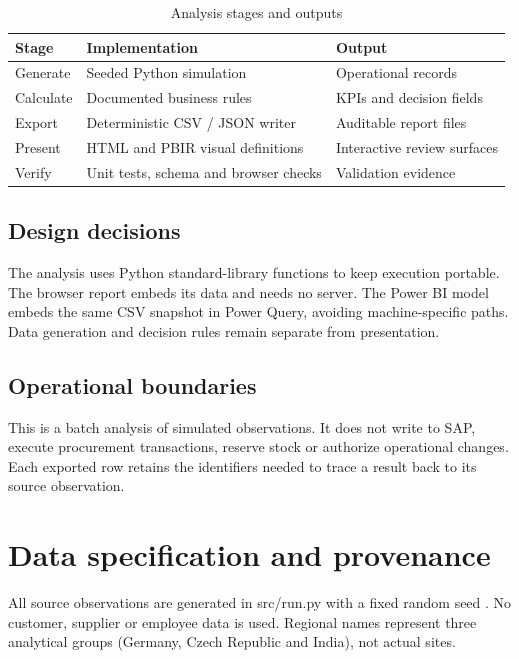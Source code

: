 \documentclass[conference,letterpaper]{IEEEtran}
\begin{document}
\begin{table}[H]
\caption{Analysis stages and outputs}\label{tab:1}
\centering\footnotesize
\setlength{\tabcolsep}{3pt}
\begin{tabularx}{\columnwidth}{>{\raggedright\arraybackslash}X >{\raggedright\arraybackslash}X >{\raggedright\arraybackslash}X}
\hline
\textbf{Stage} & \textbf{Implementation} & \textbf{Output} \\
\hline
Generate & Seeded Python simulation & Operational records \\
Calculate & Documented business rules & KPIs and decision fields \\
Export & Deterministic CSV / JSON writer & Auditable report files \\
Present & HTML and PBIR visual definitions & Interactive review surfaces \\
Verify & Unit tests, schema and browser checks & Validation evidence \\
\hline
\end{tabularx}
\end{table}

\subsection{Design decisions}

The analysis uses Python standard-library functions to keep execution portable. The browser report embeds its data and needs no server. The Power BI model embeds the same CSV snapshot in Power Query, avoiding machine-specific paths. Data generation and decision rules remain separate from presentation.


\subsection{Operational boundaries}

This is a batch analysis of simulated observations. It does not write to SAP, execute procurement transactions, reserve stock or authorize operational changes. Each exported row retains the identifiers needed to trace a result back to its source observation.


\section{Data specification and provenance}

All source observations are generated in src/run.py with a fixed random seed \cite{r1}. No customer, supplier or employee data is used. Regional names represent three analytical groups (Germany, Czech Republic and India), not actual sites.
\end{document}
